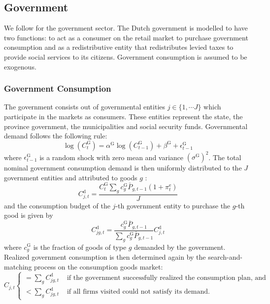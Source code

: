 \subsection{Government}
We follow \cite{poledna_economic_2019} for the government sector. The Dutch government is modelled to have two functions: to act as a consumer on the retail market to purchase government consumption and as a redistributive entity that redistributes levied taxes to provide social services to its citizens. Government consumption is assumed to be exogenous.
\subsubsection{Government Consumption}
The government consists out of governmental entities $j \in \{1,\cdots J\}$ which participate in the markets as consumers. These entities represent the state, the province government, the municipalities and social security funds. Governmental demand follows the following rule:
\begin{equation}
    \log \left(C^{\mathrm{G}}_t\right)=\alpha^{\mathrm{G}} \log \left(C^{\mathrm{G}}_{t-1}\right)+\beta^{\mathrm{G}}+\epsilon^{\mathrm{G}}_{t-1} \label{eq:govar}
\end{equation}
where $\epsilon^{\mathrm{G}}_{t-1}$ is a random shock with zero mean and variance $\left(\sigma^{\mathrm{G}}\right)^2$. The total nominal government consumption demand is then uniformly distributed to the $J$ government entities and attributed to goods $g$ :
\begin{equation}
    C_{j,t}^{\mathrm{d}}=\frac{C^{\mathrm{G}}_t \sum_g c_g^{\mathrm{G}} \bar{P}_{g,t-1}\left(1+\pi^{\mathrm{e}}_t\right)}{J}
\end{equation}
and the consumption budget of the $j$-th government entity to purchase the $g$-th good is given by
\begin{equation}
    C_{j g,t}^{\mathrm{d}}=\frac{c_g^{\mathrm{G}} \bar{P}_{g,t-1}}{\sum_g c_g^{\mathrm{G}} \bar{P}_{g,t-1}} C_{j,t}^{\mathrm{d}}
\end{equation}
where $c_g^{\mathrm{G}}$ is the fraction of goods of type $g$ demanded by the government. Realized government consumption is then determined again by the search-and-matching process on the consumption goods market:
$$
C_{j,t} \begin{cases}=\sum_g C_{j g,t}^{\mathrm{d}} & \text { if the government successfully realized the consumption plan, and } \\ <\sum_g C_{j g,t}^{\mathrm{d}} & \text { if all firms visited could not satisfy its demand. }\end{cases}
$$
